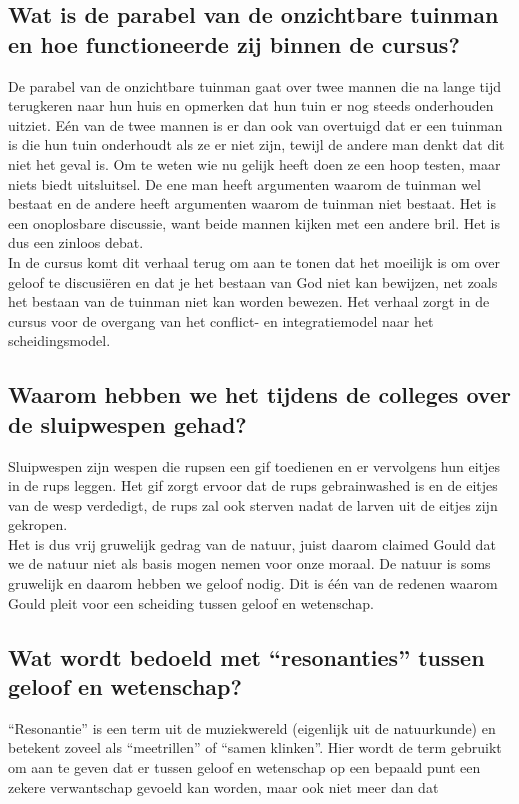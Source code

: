 \documentclass[11pt,a4paper,titlepage]{article}
\begin{document}
\subsection{Wat is de parabel van de onzichtbare tuinman en hoe functioneerde zij binnen de cursus?}
De parabel van de onzichtbare tuinman gaat over twee mannen die na lange tijd terugkeren naar hun huis en opmerken dat hun tuin er nog steeds onderhouden uitziet. Eén van de twee mannen is er dan ook van overtuigd dat er een tuinman is die hun tuin onderhoudt als ze er niet zijn, tewijl de andere man denkt dat dit niet het geval is. Om te weten wie nu gelijk heeft doen ze een hoop testen, maar niets biedt uitsluitsel. De ene man heeft argumenten waarom de tuinman wel bestaat en de andere heeft argumenten waarom de tuinman niet bestaat. Het is een onoplosbare discussie, want beide mannen kijken met een andere bril. Het is dus een zinloos debat.\\
In de cursus komt dit verhaal terug om aan te tonen dat het moeilijk is om over geloof te discusiëren en dat je het bestaan van God niet kan bewijzen, net zoals het bestaan van de tuinman niet kan worden bewezen. Het verhaal zorgt in de cursus voor de overgang van het conflict- en integratiemodel naar het scheidingsmodel.

\subsection{Waarom hebben we het tijdens de colleges over de sluipwespen gehad?}
Sluipwespen zijn wespen die rupsen een gif toedienen en er vervolgens hun eitjes in de rups leggen. Het gif zorgt ervoor dat de rups gebrainwashed is en de eitjes van de wesp verdedigt, de rups zal ook sterven nadat de larven uit de eitjes zijn gekropen. \\
Het is dus vrij gruwelijk gedrag van de natuur, juist daarom claimed Gould dat we de natuur niet als basis mogen nemen voor onze moraal. De natuur is soms gruwelijk en daarom hebben we geloof nodig. Dit is één van de redenen waarom Gould pleit voor een scheiding tussen geloof en wetenschap.
\subsection{Wat wordt bedoeld met “resonanties” tussen geloof en wetenschap? }
 “Resonantie” is een term uit de muziekwereld (eigenlijk uit de natuurkunde) en betekent zoveel als
“meetrillen” of “samen klinken”. Hier wordt de term gebruikt om aan te
geven dat er tussen geloof en wetenschap op een bepaald punt een
zekere verwantschap gevoeld kan worden, maar ook niet meer dan dat
\end{document}
